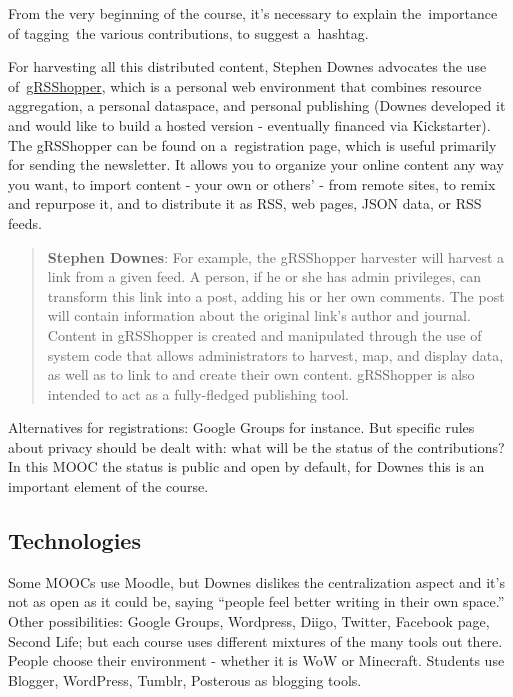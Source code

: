 From the very beginning of the course, it's necessary to explain
the~importance of tagging~the various contributions, to suggest
a~hashtag.

For harvesting all this distributed content, Stephen Downes advocates
the use of~\href{http://grsshopper.downes.ca/index.html}{gRSShopper},
which is a personal web environment that combines resource aggregation,
a personal dataspace, and personal publishing (Downes developed it and
would like to build a hosted version - eventually financed via
Kickstarter). The gRSShopper can be found on a~registration page, which
is useful primarily for sending the newsletter. It allows you to
organize your online content any way you want, to import content - your
own or others' - from remote sites, to remix and repurpose it, and to
distribute it as RSS, web pages, JSON data, or RSS feeds.

\begin{quote}
\textbf{Stephen Downes}: For example, the gRSShopper harvester will
harvest a link from a given feed. A person, if he or she has admin
privileges, can transform this link into a post, adding his or her own
comments. The post will contain information about the original link's
author and journal. Content in gRSShopper is created and manipulated
through the use of system code that allows administrators to harvest,
map, and display data, as well as to link to and create their own
content. gRSShopper is also intended to act as a fully-fledged
publishing tool.
\end{quote}

Alternatives for registrations: Google Groups for instance. But specific
rules about privacy should be dealt with: what will be the status of the
contributions? In this MOOC the status is public and open by default,
for Downes this is an important element of the course.

\subsection{Technologies}

Some MOOCs use Moodle, but Downes dislikes the centralization aspect and
it's not as open as it could be, saying ``people feel better writing in
their own space.'' Other possibilities: Google Groups, Wordpress, Diigo,
Twitter, Facebook page, Second Life; but each course uses different
mixtures of the many tools out there. People choose their environment -
whether it is WoW or Minecraft. Students use Blogger, WordPress, Tumblr,
Posterous as blogging tools.

